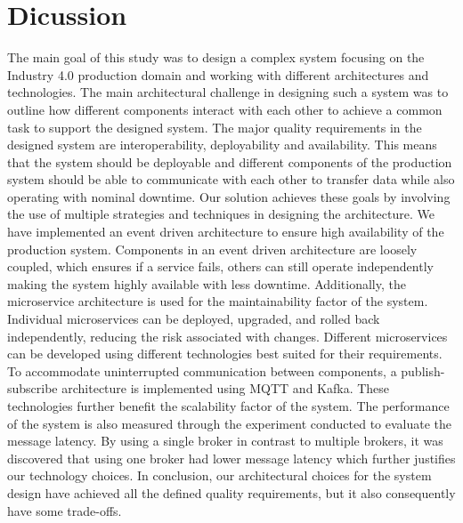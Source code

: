 \section{Dicussion}

The main goal of this study was to design a complex system focusing on the Industry 4.0 production domain and working with different architectures and technologies. The main architectural challenge in designing such a system was to outline how different components interact with each other to achieve a common task to support the designed system. The major quality requirements in the designed system are interoperability, deployability and availability. This means that the system should be deployable and different components of the production system should be able to communicate with each other to transfer data while also operating with nominal downtime. Our solution achieves these goals by involving the use of multiple strategies and techniques in designing the architecture. We have implemented an event driven architecture to ensure high availability of the production system. Components in an event driven architecture are loosely coupled, which ensures if a service fails, others can still operate independently making the system highly available with less downtime. Additionally, the microservice architecture is used for the maintainability factor of the system. Individual microservices can be deployed, upgraded, and rolled back independently, reducing the risk associated with changes. Different microservices can be developed using different technologies best suited for their requirements. To accommodate uninterrupted communication between components, a publish-subscribe architecture is implemented using MQTT and Kafka. These technologies further benefit the scalability factor of the system. The performance of the system is also measured through the experiment conducted to evaluate the message latency. By using a single broker in contrast to multiple brokers, it was discovered that using one broker had lower message latency which further justifies our technology choices. In conclusion, our architectural choices for the system design have achieved all the defined quality requirements, but it also consequently have some trade-offs.


